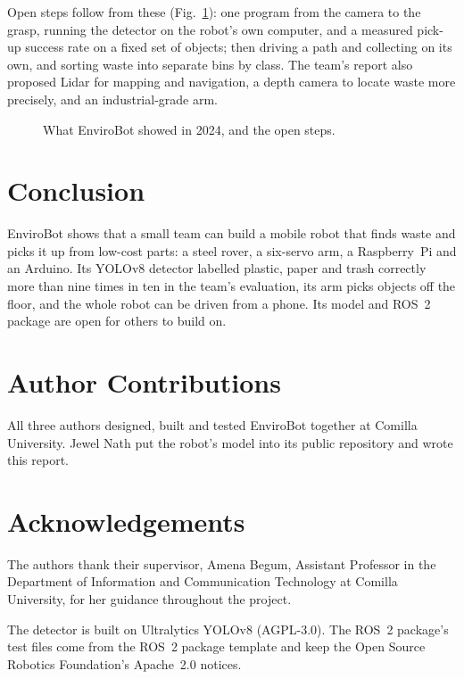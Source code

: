 \documentclass[11pt]{article}
\begin{document}
Open steps follow from these (Fig.~\ref{fig:roadmap}): one program from the camera to the grasp, running the detector on the robot's own computer, and a measured pick-up success rate on a fixed set of objects; then driving a path and collecting on its own, and sorting waste into separate bins by class. The team's report also proposed Lidar for mapping and navigation, a depth camera to locate waste more precisely, and an industrial-grade arm.

\begin{figure}[htbp]
  \centering
  \caption{What EnviroBot showed in 2024, and the open steps.}
  \label{fig:roadmap}
\end{figure}

\section{Conclusion}

EnviroBot shows that a small team can build a mobile robot that finds waste and picks it up from low-cost parts: a steel rover, a six-servo arm, a Raspberry~Pi and an Arduino. Its YOLOv8 detector labelled plastic, paper and trash correctly more than nine times in ten in the team's evaluation, its arm picks objects off the floor, and the whole robot can be driven from a phone. Its model and ROS~2 package are open for others to build on.

\section*{Author Contributions}

All three authors designed, built and tested EnviroBot together at Comilla University. Jewel Nath put the robot's model into its public repository and wrote this report.

\section*{Acknowledgements}

The authors thank their supervisor, Amena Begum, Assistant Professor in the Department of Information and Communication Technology at Comilla University, for her guidance throughout the project.

The detector is built on Ultralytics YOLOv8 (AGPL-3.0). The ROS~2 package's test files come from the ROS~2 package template and keep the Open Source Robotics Foundation's Apache~2.0 notices.
\end{document}
